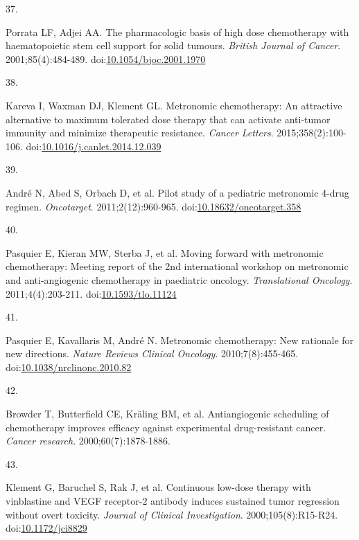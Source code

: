 \documentclass[11pt]{umnthesis}
\newlength{\csllabelwidth}
\newlength{\cslhangindent}
\newenvironment{CSLReferences}[2] %
 {%
  \setlength{\parindent}{0pt}
  \ifodd #1 \everypar{\setlength{\hangindent}{\cslhangindent}}\ignorespaces\fi
  \ifnum #2 > 0
  \setlength{\parskip}{#2\baselineskip}
  \fi
 }%
 {}
\newcommand{\CSLLeftMargin}[1]{\parbox[t]{\csllabelwidth}{#1}}
\newcommand{\CSLRightInline}[1]{\parbox[t]{\linewidth - \csllabelwidth}{#1}}
\begin{document}
\begin{CSLReferences}{0}{0}
\leavevmode{}%
\CSLLeftMargin{37. }
\CSLRightInline{Porrata LF, Adjei AA. The pharmacologic basis of high dose chemotherapy with haematopoietic stem cell support for solid tumours. \emph{British Journal of Cancer}. 2001;85(4):484-489. doi:\href{https://doi.org/10.1054/bjoc.2001.1970}{10.1054/bjoc.2001.1970}}

\leavevmode{}%
\CSLLeftMargin{38. }
\CSLRightInline{Kareva I, Waxman DJ, Klement GL. Metronomic chemotherapy: An attractive alternative to maximum tolerated dose therapy that can activate anti-tumor immunity and minimize therapeutic resistance. \emph{Cancer Letters}. 2015;358(2):100-106. doi:\href{https://doi.org/10.1016/j.canlet.2014.12.039}{10.1016/j.canlet.2014.12.039}}

\leavevmode{}%
\CSLLeftMargin{39. }
\CSLRightInline{André N, Abed S, Orbach D, et al. Pilot study of a pediatric metronomic 4-drug regimen. \emph{Oncotarget}. 2011;2(12):960-965. doi:\href{https://doi.org/10.18632/oncotarget.358}{10.18632/oncotarget.358}}

\leavevmode{}%
\CSLLeftMargin{40. }
\CSLRightInline{Pasquier E, Kieran MW, Sterba J, et al. Moving forward with metronomic chemotherapy: Meeting report of the 2nd international workshop on metronomic and anti-angiogenic chemotherapy in paediatric oncology. \emph{Translational Oncology}. 2011;4(4):203-211. doi:\href{https://doi.org/10.1593/tlo.11124}{10.1593/tlo.11124}}

\leavevmode{}%
\CSLLeftMargin{41. }
\CSLRightInline{Pasquier E, Kavallaris M, André N. Metronomic chemotherapy: New rationale for new directions. \emph{Nature Reviews Clinical Oncology}. 2010;7(8):455-465. doi:\href{https://doi.org/10.1038/nrclinonc.2010.82}{10.1038/nrclinonc.2010.82}}

\leavevmode{}%
\CSLLeftMargin{42. }
\CSLRightInline{Browder T, Butterfield CE, Kräling BM, et al. Antiangiogenic scheduling of chemotherapy improves efficacy against experimental drug-resistant cancer. \emph{Cancer research}. 2000;60(7):1878-1886.}

\leavevmode{}%
\CSLLeftMargin{43. }
\CSLRightInline{Klement G, Baruchel S, Rak J, et al. Continuous low-dose therapy with vinblastine and {VEGF} receptor-2 antibody induces sustained tumor regression without overt toxicity. \emph{Journal of Clinical Investigation}. 2000;105(8):R15-R24. doi:\href{https://doi.org/10.1172/jci8829}{10.1172/jci8829}}


\end{CSLReferences}
\end{document}
